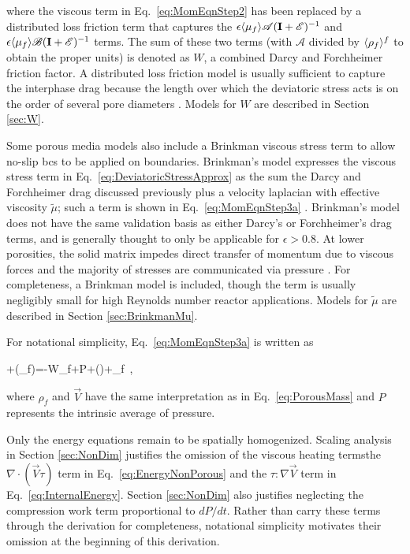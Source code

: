 \noindent where the viscous term in Eq.\ \eqref{eq:MomEqnStep2} has been replaced by a distributed loss friction term that captures the  \(\epsilon\langle\mu_f\rangle\mathscr{A}(\textbf{I}+\mathscr{E})^{-1}\) and \(\epsilon\langle\mu_f\rangle\mathscr{B}(\textbf{I}+\mathscr{E})^{-1}\) terms. The sum of these two terms (with \(\mathscr{A}\) divided by \(\langle\rho_f\rangle^f\) to obtain the proper units) is denoted as \(W\), a combined Darcy and Forchheimer friction factor. A distributed loss friction model is usually sufficient to capture the interphase drag because the length over which the deviatoric stress acts is on the order of several pore diameters \cite{kececioglu}. Models for \(W\) are described in Section \ref{sec:W}.

Some porous media models also include a Brinkman viscous stress term to allow no-slip \glspl{bc} to be applied on boundaries. Brinkman's model expresses the viscous stress term in Eq.\ \eqref{eq:DeviatoricStressApprox} as the sum the Darcy and Forchheimer drag discussed previously plus a velocity laplacian with effective viscosity \(\tilde{\mu}\); such a term is shown in Eq.\ \eqref{eq:MomEqnStep3a} \cite{nield,auwerda_2011,tecdoc1163}. Brinkman's model does not have the same validation basis as either Darcy's or Forchheimer's drag terms, and is generally thought to only be applicable for \(\epsilon>0.8\). At lower porosities, the solid matrix impedes direct transfer of momentum due to viscous forces and the majority of stresses are communicated via pressure \cite{nield}. For completeness, a Brinkman model is included, though the term is usually negligibly small for high Reynolds number reactor applications. Models for \(\tilde{\mu}\) are described in Section \ref{sec:BrinkmanMu}.

For notational simplicity, Eq.\ \eqref{eq:MomEqnStep3a} is written as

\beq
\label{eq:MomEqnStep3}
+\nabla\cdot(\epsilon\rho_f)=-W\rho_f+\epsilon\nabla P+\nabla\cdot(\tilde{\mu}\nabla{})+\epsilon\rho_f\ ,
\eeq

\noindent where \(\rho_f\) and \(\vec{V}\) have the same interpretation as in Eq.\ \eqref{eq:PorousMass} and \(P\) represents the intrinsic average of pressure.

Only the energy equations remain to be spatially homogenized. Scaling analysis in Section \ref{sec:NonDim} justifies the omission of the viscous heating terms\mdash the \(\nabla\cdot(\vec{V}\tau)\) term in Eq.\ \eqref{eq:EnergyNonPorous} and the \(\tau\colon\nabla\vec{V}\) term in Eq.\ \eqref{eq:InternalEnergy}. Section \ref{sec:NonDim} also justifies neglecting the compression work term proportional to \(dP/dt\). Rather than carry these terms through the derivation for completeness, notational simplicity motivates their omission at the beginning of this derivation. 


